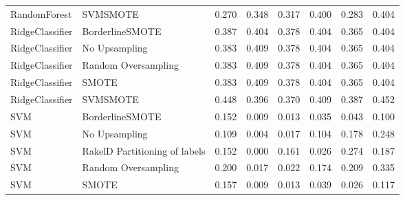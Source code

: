 \begin{tabular}{llllllll}
                   RandomForest &                      SVMSMOTE & 0.270 &                     0.348 &                 0.317 &                  0.400 &                                   0.283 &     0.404 \\
                RidgeClassifier &               BorderlineSMOTE & 0.387 &                     0.404 &                 0.378 &                  0.404 &                                   0.365 &     0.404 \\
                RidgeClassifier &                 No Upsampling & 0.383 &                     0.409 &                 0.378 &                  0.404 &                                   0.365 &     0.404 \\
                RidgeClassifier &           Random Oversampling & 0.383 &                     0.409 &                 0.378 &                  0.404 &                                   0.365 &     0.404 \\
                RidgeClassifier &                         SMOTE & 0.383 &                     0.409 &                 0.378 &                  0.404 &                                   0.365 &     0.404 \\
                RidgeClassifier &                      SVMSMOTE & 0.448 &                     0.396 &                 0.370 &                  0.409 &                                   0.387 &     0.452 \\
                            SVM &               BorderlineSMOTE & 0.152 &                     0.009 &                 0.013 &                  0.035 &                                   0.043 &     0.100 \\
                            SVM &                 No Upsampling & 0.109 &                     0.004 &                 0.017 &                  0.104 &                                   0.178 &     0.248 \\
                            SVM & RakelD Partitioning of labels & 0.152 &                     0.000 &                 0.161 &                  0.026 &                                   0.274 &     0.187 \\
                            SVM &           Random Oversampling & 0.200 &                     0.017 &                 0.022 &                  0.174 &                                   0.209 &     0.335 \\
                            SVM &                         SMOTE & 0.157 &                     0.009 &                 0.013 &                  0.039 &                                   0.026 &     0.117 \\

\end{tabular}
